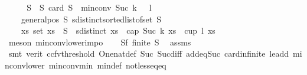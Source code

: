 \begin{isabellebody}
\ \ \isamarkupfalse%
\ \isamarkupfalse%
\ S{}\ \ S{}{\isacharcolon}{\kern0pt}\ {\isachardoublequoteopen}card\ S{}\ {\isacharequal}{\kern0pt}\ min{\isacharunderscore}{\kern0pt}conv\ {\isacharparenleft}{\kern0pt}Suc\ {\isacharparenleft}{\kern0pt}k\ {\isacharplus}{\kern0pt}\ {}{\isacharparenright}{\kern0pt}{\isacharparenright}{\kern0pt}\ {\isacharparenleft}{\kern0pt}l\ {\isacharplus}{\kern0pt}\ {}{\isacharparenright}{\kern0pt}\ {\isacharminus}{\kern0pt}\ {}{\isachardoublequoteclose}\ \isanewline
\ \ \ \ {\isachardoublequoteopen}general{\isacharunderscore}{\kern0pt}pos\ S{}{\isachardoublequoteclose}\ {\isachardoublequoteopen}sdistinct{\isacharparenleft}{\kern0pt}sorted{\isacharunderscore}{\kern0pt}list{\isacharunderscore}{\kern0pt}of{\isacharunderscore}{\kern0pt}set\ S{}{\isacharparenright}{\kern0pt}{\isachardoublequoteclose}\isanewline
\ \ \ \ {\isachardoublequoteopen}{\isasymforall}xs{\isachardot}{\kern0pt}\ set\ xs\ {\isasymsubseteq}\ S{}\ {\isasymand}\ {\isacharparenleft}{\kern0pt}sdistinct\ xs{\isacharparenright}{\kern0pt}\ {\isasymlongrightarrow}\ {\isasymnot}{\isacharparenleft}{\kern0pt}cap\ {\isacharparenleft}{\kern0pt}Suc\ {\isacharparenleft}{\kern0pt}k{\isacharplus}{\kern0pt}{}{\isacharparenright}{\kern0pt}{\isacharparenright}{\kern0pt}\ xs\ {\isasymor}\ cup\ {\isacharparenleft}{\kern0pt}l{\isacharplus}{\kern0pt}{}{\isacharparenright}{\kern0pt}\ xs{\isacharparenright}{\kern0pt}{\isachardoublequoteclose}\isanewline
\ \ \ \ \isamarkupfalse%
\ {\isacharparenleft}{\kern0pt}meson\ min{\isacharunderscore}{\kern0pt}conv{\isacharunderscore}{\kern0pt}lower{\isacharunderscore}{\kern0pt}imp{}o{\isacharparenright}{\kern0pt}\isanewline
\ \ \isamarkupfalse%
\ S{}f{\isacharcolon}{\kern0pt}\ {\isachardoublequoteopen}finite\ S{}{\isachardoublequoteclose}\ \isamarkupfalse%
\ assms{\isacharparenleft}{\kern0pt}{}{\isacharparenright}{\kern0pt}\isanewline
\ \ \ \ \isamarkupfalse%
\ {\isacharparenleft}{\kern0pt}smt\ {\isacharparenleft}{\kern0pt}verit{\isacharcomma}{\kern0pt}\ ccfv{\isacharunderscore}{\kern0pt}threshold{\isacharparenright}{\kern0pt}\ One{\isacharunderscore}{\kern0pt}nat{\isacharunderscore}{\kern0pt}def\ Suc{\isacharunderscore}{\kern0pt}{}\ Suc{\isacharunderscore}{\kern0pt}diff{\isacharunderscore}{\kern0pt}{}\ add{\isacharunderscore}{\kern0pt}{}{\isacharunderscore}{\kern0pt}eq{\isacharunderscore}{\kern0pt}Suc{\isacharprime}{\kern0pt}\ card{\isachardot}{\kern0pt}infinite\ le{\isacharunderscore}{\kern0pt}add{}\ min{\isacharunderscore}{\kern0pt}conv{\isacharunderscore}{\kern0pt}lower\ min{\isacharunderscore}{\kern0pt}conv{\isacharunderscore}{\kern0pt}min\ min{\isacharunderscore}{\kern0pt}def\ not{\isacharunderscore}{\kern0pt}less{\isacharunderscore}{\kern0pt}eq{\isacharunderscore}{\kern0pt}eq{\isacharparenright}{\kern0pt}\isanewline

\end{isabellebody}
